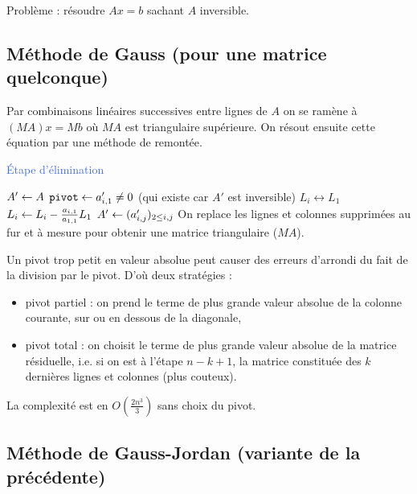 Problème : résoudre $Ax = b$ sachant $A$ inversible.

\subsection{Méthode de Gauss (pour une matrice quelconque)}

	Par combinaisons linéaires successives entre lignes de $A$ on se ramène à $(MA)x = Mb$ où $MA$ est triangulaire supérieure.
	On résout ensuite cette équation par une méthode de remontée.
	
	\begin{algorithm}[h]
	\caption{\textcolor{RoyalBlue}{Étape d'élimination}}
	$A' \leftarrow A$ \;
	{
		$\texttt{pivot} \leftarrow a'_{i,1} \neq 0$ (qui existe car $A'$ est inversible) \;
		{
			$L_i \leftrightarrow L_1$ \;
		}
		{
			$L_i \leftarrow L_i - \frac{a_{i,1}}{a_{1,1}} L_1$ \;
		}
		$A' \leftarrow (a'_{i,j})_{2 \leq i,j}$
	}
	On replace les lignes et colonnes supprimées au fur et à mesure pour obtenir une matrice triangulaire ($MA$).
	\end{algorithm}

	Un pivot trop petit en valeur absolue peut causer des erreurs d'arrondi du fait de la division par le pivot.
	D'où deux stratégies :
	\begin{itemize}
	\item[\textbullet] pivot partiel : on prend le terme de plus grande valeur absolue de la colonne courante, sur ou en dessous de la diagonale,
	\item[\textbullet] pivot total : on choisit le terme de plus grande valeur absolue de la matrice résiduelle, i.e. si on est à l'étape $n - k + 1$, la matrice constituée des $k$ dernières lignes et colonnes (plus couteux).
	\end{itemize}
	
	La complexité est en $O \left( \frac{2n^3}{3} \right)$ sans choix du pivot.

\subsection{Méthode de Gauss-Jordan (variante de la précédente)}

